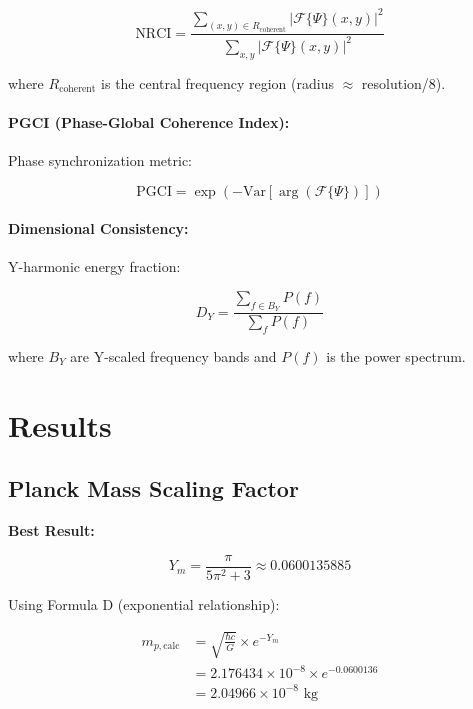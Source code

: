 \documentclass[11pt,a4paper]{article}
\begin{document}
\begin{equation}
\text{NRCI} = \frac{\sum_{(x,y) \in R_{\text{coherent}}} |\mathcal{F}\{\Psi\}(x,y)|^2}{\sum_{x,y} |\mathcal{F}\{\Psi\}(x,y)|^2}
\end{equation}

where $R_{\text{coherent}}$ is the central frequency region (radius $\approx$ resolution/8).

\paragraph{PGCI (Phase-Global Coherence Index):} Phase synchronization metric:

\begin{equation}
\text{PGCI} = \exp(-\text{Var}[\arg(\mathcal{F}\{\Psi\})])
\end{equation}

\paragraph{Dimensional Consistency:} Y-harmonic energy fraction:

\begin{equation}
D_Y = \frac{\sum_{f \in B_Y} P(f)}{\sum_f P(f)}
\end{equation}

where $B_Y$ are Y-scaled frequency bands and $P(f)$ is the power spectrum.

\section{Results}

\subsection{Planck Mass Scaling Factor}

\textbf{Best Result:}

\begin{equation}
Y_m = \frac{\pi}{5\pi^2 + 3} \approx 0.0600135885
\end{equation}

Using Formula D (exponential relationship):

\begin{align}
m_{p,\text{calc}} &= \sqrt{\frac{\hbar c}{G}} \times e^{-Y_m} \\
&= 2.176434 \times 10^{-8} \times e^{-0.0600136} \\
&= 2.04966 \times 10^{-8} \text{ kg}
\end{align}
\end{document}
